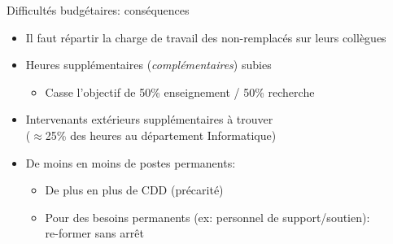 \documentclass[10pt,final,usepdftitle=false]{beamer}
\begin{document}

\begin{frame}{Difficultés budgétaires: conséquences}
\begin{itemize}
\item Il faut répartir la charge de travail des non-remplacés sur leurs collègues
\smallskip
\item Heures supplémentaires (\textsl{complémentaires}) subies
	\begin{itemize}
	\item Casse l'objectif de 50\% enseignement / 50\% recherche
	\end{itemize}
\smallskip
\item Intervenants extérieurs supplémentaires à trouver\\
	($\approx$25\% des heures au département Informatique)
\smallskip
\item De moins en moins de postes permanents:
\begin{itemize}
\item De plus en plus de CDD (précarité)
\smallskip
\item Pour des besoins permanents (ex: personnel de support/soutien):\\ re-former sans arrêt
\end{itemize}
\end{itemize}
\end{frame}
\end{document}
